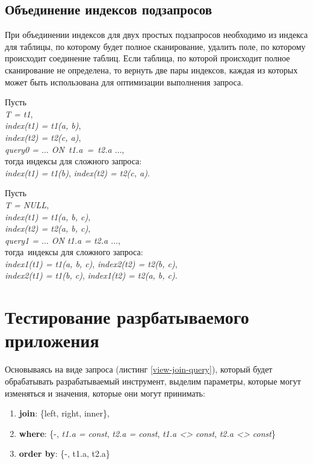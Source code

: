 


\subsection{Объединение индексов подзапросов}

При объединении индексов для двух простых подзапросов необходимо из индекса для таблицы, по которому будет полное сканирование, удалить поле, по которому происходит соединение таблиц. Если таблица, по которой происходит полное сканирование не определена, то вернуть две пары индексов, каждая из которых может быть использована для оптимизации выполнения запроса.

Пусть \\
\textit{T = t1},\\
\textit{index(t1) = t1(a, b)},\\
\textit{index(t2) = t2(c, a)},\\
\textit{query0 = $\ldots$ ON t1.a = t2.a $\ldots$},\\
тогда индексы для сложного запроса: \\
\textit{index(t1) = t1(b)}, \textit{index(t2) = t2(c, a)}.

Пусть \\
\textit{T = NULL},\\
\textit{index(t1) = t1(a, b, c)},\\
\textit{index(t2) = t2(a, b, c)},\\
\textit{query1 = $\ldots$ ON t1.a = t2.a $\ldots$},\\
тогда индексы для сложного запроса: \\
\textit{index1(t1) = t1(a, b, c)}, \textit{index2(t2) = t2(b, c)},\\ 
\textit{index2(t1) = t1(b, c)}, \textit{index1(t2) = t2(a, b, c)}.




\section{Тестирование разрбатываемого приложения}

Основываясь на виде запроса (листинг \ref{view-join-query}), который будет обрабатывать разрабатываемый инструмент, выделим параметры, которые могут изменяться и значения, которые они могут принимать:

\begin{enumerate}
\item \textbf{join}: \{left, right, inner\},
\item \textbf{where}: \{-, \textit{t1.a = const}, \textit{t2.a = const}, \textit{t1.a <> const}, \textit{t2.a <> const}\}
\item \textbf{order by}: \{-, t1.a, t2.a\}
\end{enumerate}

